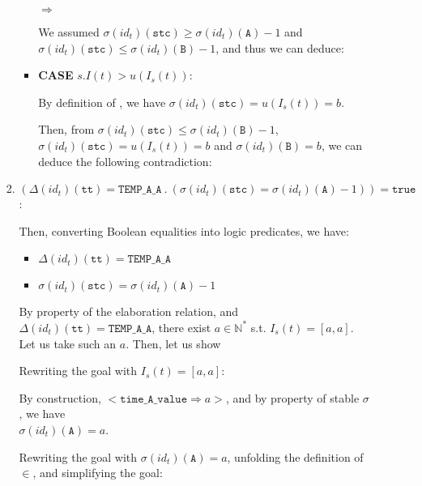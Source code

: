 \documentclass[dvipsnames,12pt]{article}
\begin{document}
\begin{niproof}
\begin{enumerate}
\begin{enumerate}
\begin{enumerate}
\begin{itemize}
          $\Rightarrow{}$
          
          We assumed $\sigma(id_t)(\texttt{stc})\ge{}\sigma(id_t)(\texttt{A})-1$ and
          $\sigma(id_t)(\texttt{stc})\le{}\sigma(id_t)(\texttt{B})-1$, and thus we can deduce:
          
        \item \textbf{CASE} $s.I(t)>u(I_s(t))$:

          By definition of \upSim, we have
          $\sigma(id_t)(\texttt{stc})=u(I_s(t))=b$.

          Then, from $\sigma(id_t)(\texttt{stc})\le{}\sigma(id_t)(\texttt{B})-1$,
          $\sigma(id_t)(\texttt{stc})=u(I_s(t))=b$ and
          $\sigma(id_t)(\texttt{B})=b$, we can deduce the following
          contradiction:\\
        \end{itemize}
      \item
        $(\Delta(id_t)(\texttt{tt})=\mathtt{TEMP\_A\_A}~.~(\sigma(id_t)(\texttt{stc})={}\sigma(id_t)(\texttt{A})-1))=\mathtt{true}$:

        Then, converting Boolean equalities into logic predicates, we
        have:
        \begin{itemize}
        \item $\Delta(id_t)(\texttt{tt})=\mathtt{TEMP\_A\_A}$
        \item $\sigma(id_t)(\texttt{stc})=\sigma(id_t)(\texttt{A})-1$
        \end{itemize}

        By property of the elaboration relation, and
        $\Delta(id_t)(\texttt{tt})=\mathtt{TEMP\_A\_A}$, there exist
        $a\in\mathbb{N}^{*}$ s.t. $I_s(t)=[a,a]$. Let us take such an
        $a$. Then, let us show 

        Rewriting the goal with $I_s(t)=[a,a]$:
        
        By construction,
        ${<}\mathtt{time\_A\_value\Rightarrow}{}a{>}$, and by property
        of stable $\sigma$, we have\\ $\sigma(id_t)(\texttt{A})=a$.

        Rewriting the goal with $\sigma(id_t)(\texttt{A})=a$, unfolding the
        definition of $\in$, and simplifying the goal:


\end{enumerate}
\end{enumerate}
\end{enumerate}
\end{niproof}
\end{document}
